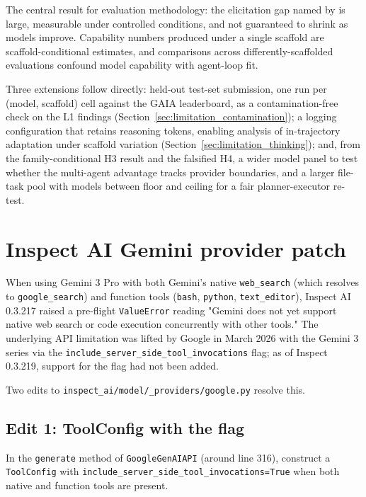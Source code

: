 \documentclass[10pt]{article} %
\begin{document}
    The central result for evaluation methodology: the elicitation gap named by \citet{kwa2026measuring} is large, measurable under controlled conditions, and not guaranteed to shrink as models improve. Capability numbers produced under a single scaffold are scaffold-conditional estimates, and comparisons across differently-scaffolded evaluations confound model capability with agent-loop fit.

    Three extensions follow directly: held-out test-set submission, one run per (model, scaffold) cell against the GAIA leaderboard, as a contamination-free check on the L1 findings (Section~\ref{sec:limitation_contamination}); a logging configuration that retains reasoning tokens, enabling analysis of in-trajectory adaptation under scaffold variation (Section~\ref{sec:limitation_thinking}); and, from the family-conditional H3 result and the falsified H4, a wider model panel to test whether the multi-agent advantage tracks provider boundaries, and a larger file-task pool with models between floor and ceiling for a fair planner-executor re-test.





\appendix
\section{Inspect AI Gemini provider patch}\label{app:gemini_patch}

    When using Gemini 3 Pro with both Gemini's native \texttt{web\_search} (which resolves to \texttt{google\_search}) and function tools (\texttt{bash}, \texttt{python}, \texttt{text\_editor}), Inspect AI 0.3.217 raised a pre-flight \texttt{ValueError} reading "Gemini does not yet support native web search or code execution concurrently with other tools." The underlying API limitation was lifted by Google in March 2026 with the Gemini 3 series via the \texttt{include\_server\_side\_tool\_invocations} flag; as of Inspect 0.3.219, support for the flag had not been added.
    
    Two edits to \texttt{inspect\_ai/model/\_providers/google.py} resolve this.
    
        \subsection{Edit 1: ToolConfig with the flag}
        
            In the \texttt{generate} method of \texttt{GoogleGenAIAPI} (around line 316), construct a \texttt{ToolConfig} with \texttt{include\_server\_side\_tool\_invocations=True} when both native and function tools are present.
            
\end{document}

